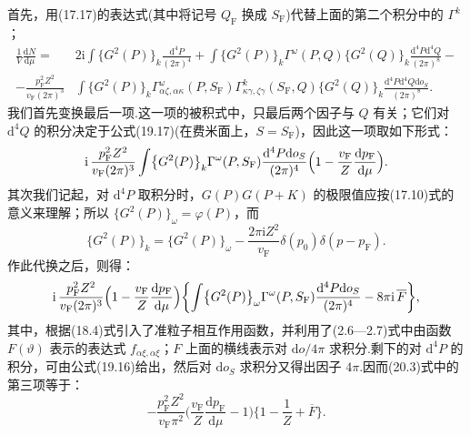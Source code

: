首先，用(17.17)的表达式(其中将记号 $Q_{\mathrm{F}}$ 换成 $S_{\mathrm{F}}$)代替上面的第二个积分中的 $\Gamma^{k}$；
\begin{equation}
\begin{aligned}
  \frac{1}{V}\frac{\mathrm{d}N}{\mathrm{d}\mu}={}&2\mathrm{i}\int\bigl\{G^2(P)\bigr\}_{k}\frac{\mathrm{d}^4P}{(2\pi)^4}
  +\int\bigl\{G^2(P)\bigr\}_{k}\Gamma^{\omega}(P,Q)\bigl\{G^2(Q)\bigr\}_{k}\frac{\mathrm{d}^4P\mathrm{d}^4Q}{(2\pi)^8}-\\
  -\frac{p_{\mathrm{F}}^2Z^2}{v_{\mathrm{F}}(2\pi)^3}&\int\bigl\{G^2(P)\bigr\}_{k}\Gamma^{\omega}_{\alpha\zeta,\alpha\kappa}(P,S_{\mathrm{F}})\Gamma^{k}_{\kappa\gamma,\zeta\gamma}(S_{\mathrm{F}},Q)\bigl\{G^2(Q)\bigr\}_{k}\frac{\mathrm{d}^4P\mathrm{d}^4Q\mathrm{d}o_S}{(2\pi)^8}.
\end{aligned}
\end{equation}
我们首先变换最后一项.这一项的被积式中，只最后两个因子与 $Q$ 有关；它们对 $\mathrm{d}^4Q$ 的积分决定于公式(19.17)(在费米面上，$S=S_{\mathrm{F}}$)，因此这一项取如下形式：
\begin{equation*}
  \mathrm{i}\,\frac{p_{\mathrm{F}}^2Z^2}{v_{\mathrm{F}}(2\pi)^3}\int\bigl\{G^2(P)\bigr\}_{k}\Gamma^{\omega}(P,S_{\mathrm{F}})
  \frac{\mathrm{d}^4P\mathrm{d}o_S}{(2\pi)^4}\Bigl(1-\frac{v_{\mathrm{F}}}{Z}\frac{\mathrm{d}p_{\mathrm{F}}}{\mathrm{d}\mu}\Bigr).
\end{equation*}
其次我们记起，对 $\mathrm{d}^4P$ 取积分时，$G(P)G(P+K)$ 的极限值应按(17.10)式的意义来理解；所以 $\{G^2(P)\}_{\omega}=\varphi(P)$，而
\begin{equation}
  \bigl\{G^2(P)\bigr\}_{k}=\bigl\{G^2(P)\bigr\}_{\omega}-\frac{2\pi\mathrm{i}Z^2}{v_{\mathrm{F}}}\delta(p_0)\delta(p-p_{\mathrm{F}}).
\end{equation}
作此代换之后，则得：
\begin{equation*}
  \mathrm{i}\,\frac{p_{\mathrm{F}}^2Z^2}{v_{\mathrm{F}}(2\pi)^3}\Bigl(1-\frac{v_{\mathrm{F}}}{Z}\frac{\mathrm{d}p_{\mathrm{F}}}{\mathrm{d}\mu}\Bigr)
  \biggl\{\int\bigl\{G^2(P)\bigr\}_{\omega}\Gamma^{\omega}(P,S_{\mathrm{F}})\frac{\mathrm{d}^4P\mathrm{d}o_S}{(2\pi)^4}-8\pi\mathrm{i}\,\overline{F}\biggr\},
\end{equation*}
其中，根据(18.4)式引入了准粒子相互作用函数，并利用了(2.6—2.7)式中由函数 $F(\vartheta)$ 表示的表达式 $f_{\alpha\xi,\alpha\xi}$；$F$ 上面的横线表示对 $\mathrm{d}o/4\pi$ 求积分.剩下的对 $\mathrm{d}^4P$ 的积分，可由公式(19.16)给出，然后对 $\mathrm{d}o_S$ 求积分又得出因子 $4\pi$.因而(20.3)式中的第三项等于：
\begin{equation}
  -\frac{p_{\mathrm{F}}^2Z^2}{v_{\mathrm{F}}\pi^2}\biggl(\frac{v_{\mathrm{F}}}{Z}\frac{\mathrm{d}p_{\mathrm{F}}}{\mathrm{d}\mu}-1\biggr)\biggl\{1-\frac{1}{Z}+\overline{F}\biggr\}.
\end{equation}
